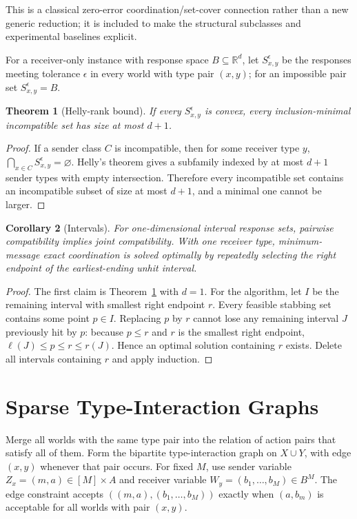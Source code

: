 \documentclass[letterpaper,10pt]{article}
\newtheorem{theorem}{Theorem}
\newtheorem{corollary}[theorem]{Corollary}
\begin{document}
This is a classical zero-error coordination/set-cover connection rather than a
new generic reduction; it is included to make the structural subclasses and
experimental baselines explicit.

For a receiver-only instance with response space $B\subseteq\mathbb R^d$, let
$S_{x,y}^\epsilon$ be the responses meeting tolerance $\epsilon$ in every world
with type pair $(x,y)$; for an impossible pair set $S_{x,y}^\epsilon=B$.

\begin{theorem}[Helly-rank bound]\label{thm:helly-supp}
If every $S_{x,y}^\epsilon$ is convex, every inclusion-minimal incompatible set
has size at most $d+1$.
\end{theorem}
\begin{proof}
If a sender class $C$ is incompatible, then for some receiver type $y$,
$\bigcap_{x\in C}S_{x,y}^\epsilon=\varnothing$. Helly's theorem gives a
subfamily indexed by at most $d+1$ sender types with empty intersection.
Therefore every incompatible set contains an incompatible subset of size at
most $d+1$, and a minimal one cannot be larger.
\end{proof}

\begin{corollary}[Intervals]\label{cor:intervals}
For one-dimensional interval response sets, pairwise compatibility implies
joint compatibility. With one receiver type, minimum-message exact
coordination is solved optimally by repeatedly selecting the right endpoint of
the earliest-ending unhit interval.
\end{corollary}
\begin{proof}
The first claim is Theorem~\ref{thm:helly-supp} with $d=1$. For the algorithm,
let $I$ be the remaining interval with smallest right endpoint $r$. Every
feasible stabbing set contains some point $p\in I$. Replacing $p$ by $r$ cannot
lose any remaining interval $J$ previously hit by $p$: because $p\le r$ and
$r$ is the smallest right endpoint, $\ell(J)\le p\le r\le r(J)$. Hence an
optimal solution containing $r$ exists. Delete all intervals containing $r$
and apply induction.
\end{proof}

\section{Sparse Type-Interaction Graphs}

Merge all worlds with the same type pair into the relation of action pairs that
satisfy all of them. Form the bipartite type-interaction graph on $X\cup Y$,
with edge $(x,y)$ whenever that pair occurs. For fixed $M$, use sender variable
$Z_x=(m,a)\in[M]\times A$ and receiver variable
$W_y=(b_1,\ldots,b_M)\in B^M$. The edge constraint accepts
$((m,a),(b_1,\ldots,b_M))$ exactly when $(a,b_m)$ is acceptable for all worlds
with pair $(x,y)$.
\end{document}
